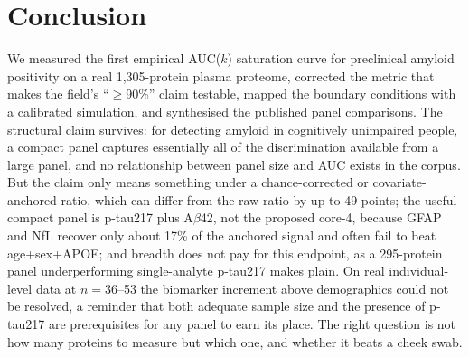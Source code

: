 \documentclass{article}
\begin{document}
\section{Conclusion}

We measured the first empirical AUC($k$) saturation curve for preclinical
amyloid positivity on a real 1{,}305-protein plasma proteome, corrected the
metric that makes the field's ``$\geq$90\%'' claim testable, mapped the
boundary conditions with a calibrated simulation, and synthesised the published
panel comparisons. The structural claim survives: for detecting amyloid in
cognitively unimpaired people, a compact panel captures essentially all of the
discrimination available from a large panel, and no relationship between panel
size and AUC exists in the corpus. But the claim only means something under a
chance-corrected or covariate-anchored ratio, which can differ from the raw
ratio by up to 49 points; the useful compact panel is p-tau217 plus A$\beta$42,
not the proposed core-4, because GFAP and NfL recover only about 17\% of the
anchored signal and often fail to beat age+sex+APOE; and breadth does not pay
for this endpoint, as a 295-protein panel underperforming single-analyte
p-tau217 makes plain. On real individual-level data at $n=36$--53 the biomarker
increment above demographics could not be resolved, a reminder that both
adequate sample size and the presence of p-tau217 are prerequisites for any
panel to earn its place. The right question is not how many proteins to measure
but which one, and whether it beats a cheek swab.
\end{document}
